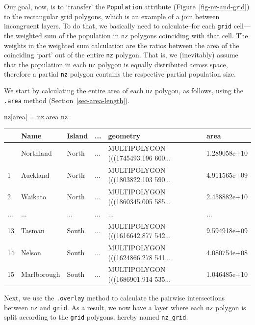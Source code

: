 \documentclass[
  letterpaper,
]{krantz}
\newenvironment{Shaded}{\begin{snugshade}}{\end{snugshade}}
\newcommand{\NormalTok}[1]{\textcolor[rgb]{0.00,0.23,0.31}{#1}}
\newcommand{\OperatorTok}[1]{\textcolor[rgb]{0.37,0.37,0.37}{#1}}
\newcommand{\StringTok}[1]{\textcolor[rgb]{0.13,0.47,0.30}{#1}}
\begin{document}
Our goal, now, is to `transfer' the
\texttt{\textquotesingle{}Population\textquotesingle{}} attribute
(Figure~\ref{fig-nz-and-grid}) to the rectangular grid polygons, which
is an example of a join between incongruent layers. To do that, we
basically need to calculate--for each \texttt{grid} cell---the weighted
sum of the population in \texttt{nz} polygons coinciding with that cell.
The weights in the weighted sum calculation are the ratios between the
area of the coinciding `part' out of the entire \texttt{nz} polygon.
That is, we (inevitably) assume that the population in each \texttt{nz}
polygon is equally distributed across space, therefore a partial
\texttt{nz} polygon contains the respective partial population size.

We start by calculating the entire area of each \texttt{nz} polygon, as
follows, using the \texttt{.area} method
(Section~\ref{sec-area-length}).

\begin{Shaded}
\begin{Highlighting}[]
\NormalTok{nz[}\StringTok{\textquotesingle{}area\textquotesingle{}}\NormalTok{] }\OperatorTok{=}\NormalTok{ nz.area}
\NormalTok{nz}
\end{Highlighting}
\end{Shaded}

\begin{longtable}[]{@{}llllll@{}}
\toprule\noalign{}
& Name & Island & ... & geometry & area \\
\midrule\noalign{}
\endhead
\bottomrule\noalign{}
\endlastfoot
0 & Northland & North & ... & MULTIPOLYGON (((1745493.196 600... &
1.289058e+10 \\
1 & Auckland & North & ... & MULTIPOLYGON (((1803822.103 590... &
4.911565e+09 \\
2 & Waikato & North & ... & MULTIPOLYGON (((1860345.005 585... &
2.458882e+10 \\
... & ... & ... & ... & ... & ... \\
13 & Tasman & South & ... & MULTIPOLYGON (((1616642.877 542... &
9.594918e+09 \\
14 & Nelson & South & ... & MULTIPOLYGON (((1624866.278 541... &
4.080754e+08 \\
15 & Marlborough & South & ... & MULTIPOLYGON (((1686901.914 535... &
1.046485e+10 \\
\end{longtable}

Next, we use the \texttt{.overlay} method to calculate the pairwise
intersections between \texttt{nz} and \texttt{grid}. As a result, we now
have a layer where each \texttt{nz} polygon is split according to the
\texttt{grid} polygons, hereby named \texttt{nz\_grid}.
\end{document}
